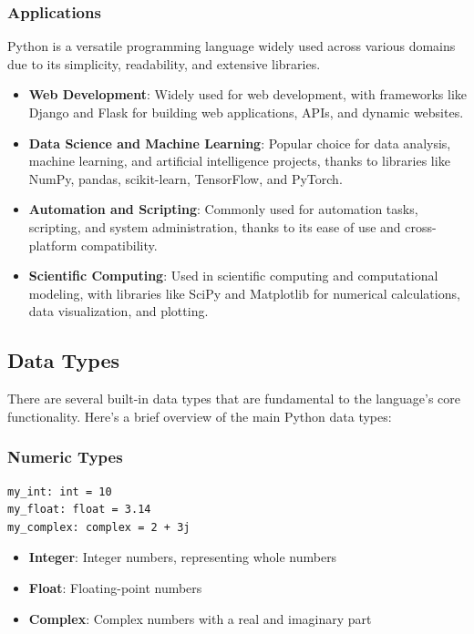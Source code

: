 \subsubsection{Applications}
Python is a versatile programming language widely used across various domains due to its simplicity, readability, and extensive libraries.
\begin{itemize}
    \item \textbf{Web Development}: Widely used for web development, with frameworks like Django and Flask for building web applications, APIs, and dynamic websites.
    \item \textbf{Data Science and Machine Learning}: Popular choice for data analysis, machine learning, and artificial intelligence projects, thanks to libraries like NumPy, pandas, scikit-learn, TensorFlow, and PyTorch.
    \item \textbf{Automation and Scripting}: Commonly used for automation tasks, scripting, and system administration, thanks to its ease of use and cross-platform compatibility.
    \item \textbf{Scientific Computing}: Used in scientific computing and computational modeling, with libraries like SciPy and Matplotlib for numerical calculations, data visualization, and plotting.
\end{itemize}

\newpage
\subsection{Data Types}

There are several built-in data types that are fundamental to the language's core functionality. Here's a brief overview of the main Python data types:

\subsubsection{Numeric Types}
\begin{codebox}
\begin{verbatim}
my_int: int = 10
my_float: float = 3.14
my_complex: complex = 2 + 3j
\end{verbatim}
\end{codebox}
\begin{itemize}
\item \textbf{Integer}: Integer numbers, representing whole numbers
\item \textbf{Float}: Floating-point numbers
\item \textbf{Complex}: Complex numbers with a real and imaginary part
\end{itemize}

